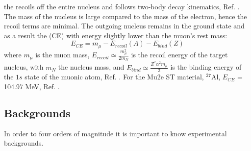 the  recoils off the entire nucleus and follows two-body decay kinematics, 
Ref. \cite{bartoszek2015mu2e}. The mass of the nucleus is large compared to the 
mass of the electron, hence the recoil terms are minimal. The outgoing nucleus 
remains in the ground state and as a result the 
 (CE) 
 with  energy slightly lower than the muon's rest mass:
\begin{equation}
    E_{CE} = m_\mu - E_{recoil}(A) - E_{bind}(Z) 
\end{equation}
where $m_\mu$ is the muon mass, $E_{recoil}\simeq \frac{m^2_\mu}{2 m_N}$ is 
the recoil energy of the target nucleus, with $m_N$ the nucleus mass, and 
$E_{bind}\simeq \frac{Z^2 \alpha^2 m_\mu}{2}$ is the binding energy of the 
$1s$ state of the muonic atom, Ref. \cite{universe9010054}. For the Mu2e 
ST material, $^{27}$Al, $E_{CE}$ = 104.97 MeV, Ref. \cite{PhysRevD.84.013006}.
\subsection{Backgrounds}\label{backgrounds}
In order to   four orders of magnitude
it is important to know  experimental backgrounds.


